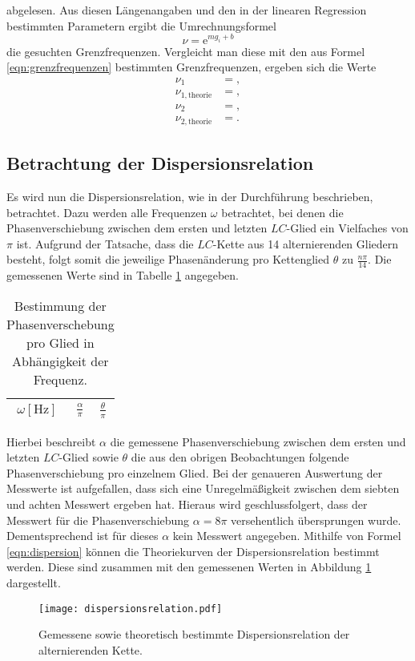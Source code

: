 abgelesen.
Aus diesen Längenangaben und den in der linearen Regression bestimmten Parametern ergibt die Umrechnungsformel
\begin{equation}
  \nu = \mathrm{e}^{m g_i + b}
\end{equation}
die gesuchten Grenzfrequenzen.
Vergleicht man diese mit den aus Formel \ref{eqn:grenzfrequenzen} bestimmten Grenzfrequenzen, ergeben sich die Werte
\begin{align*}
  \nu_{1} &= , \\
  \nu_{1, \text{theorie}} &= , \\
  \nu_{2} &= , \\
  \nu_{2, \text{theorie}} &= .
\end{align*}


\subsection{Betrachtung der Dispersionsrelation}
Es wird nun die Dispersionsrelation, wie in der Durchführung beschrieben, betrachtet.
Dazu werden alle Frequenzen $\omega$ betrachtet, bei denen die Phasenverschiebung zwischen dem ersten und letzten $LC$-Glied ein Vielfaches von $\pi$ ist.
Aufgrund der Tatsache, dass die $LC$-Kette aus 14 alternierenden Gliedern besteht, folgt somit die jeweilige Phasenänderung pro Kettenglied $\theta$ zu $\frac{n \pi}{14}$.
Die gemessenen Werte sind in Tabelle \ref{tab:dispersion} angegeben.
\begin{table}
  \centering
  \caption{Bestimmung der Phasenverschebung pro Glied in Abhängigkeit der Frequenz.}
  \label{tab:dispersion}
  \begin{tabular}{c c c}
    \toprule
    {$\omega [\si{\hertz}]$} & {$\frac{\alpha}{\pi} $} & {$\frac{\theta}{\pi} $}\\
    \midrule
    
    \bottomrule
  \end{tabular}
\end{table}
Hierbei beschreibt $\alpha$ die gemessene Phasenverschiebung zwischen dem ersten und letzten $LC$-Glied sowie $\theta$ die aus den obrigen Beobachtungen folgende Phasenverschiebung pro einzelnem Glied.
Bei der genaueren Auswertung der Messwerte ist aufgefallen, dass sich eine Unregelmäßigkeit zwischen dem siebten und achten Messwert ergeben hat.
Hieraus wird geschlussfolgert, dass der Messwert für die Phasenverschiebung $\alpha = 8 \pi$ versehentlich übersprungen wurde.
Dementsprechend ist für dieses $\alpha$ kein Messwert angegeben.
Mithilfe von Formel \ref{eqn:dispersion} können die Theoriekurven der Dispersionsrelation bestimmt werden.
Diese sind zusammen mit den gemessenen Werten in Abbildung \ref{fig:dispersion_fertig} dargestellt.
\begin{figure}
  \centering
  \texttt{[image: dispersionsrelation.pdf]}
  \caption{Gemessene sowie theoretisch bestimmte Dispersionsrelation der alternierenden Kette.}
  \label{fig:dispersion_fertig}
\end{figure}

